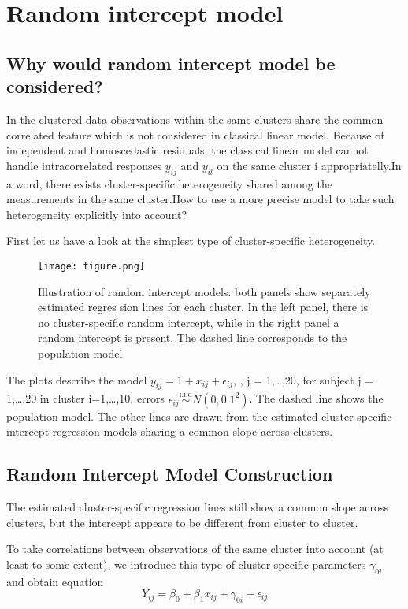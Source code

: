 \documentclass[12pt]{article}
\title{}
\author{Ziwen Tang}
\date{17 February 2019}
\begin{document}
\maketitle
\section{Random intercept model}

\subsection{Why would random intercept model be considered?}
In the clustered data observations within the same clusters share the common correlated feature which is not considered in classical linear model.
Because of independent and homoscedastic residuals, the classical linear model cannot handle intracorrelated responses $y_{ij}$ and $y_{il}$ on the same cluster i appropriatelly.In a word, there exists cluster-specific heterogeneity shared among the measurements in the same cluster.How to use a more precise model to take such heterogeneity explicitly into account? 

First let us have a look at the simplest type of cluster-specific heterogeneity.
\begin{figure}[ht]
\centering
\texttt{[image: figure.png]}
\caption{Illustration of random intercept models: both panels show separately estimated regression lines for each cluster. In the left panel, there is no cluster-specific random intercept, while in
the right panel a random intercept is present. The dashed line corresponds to the population model}
\label{fig:label}
\end{figure}

The plots describe the model $y_{ij} = 1 + x_{ij} +\epsilon_{ij}$, , j = 1,…,20, for subject j = 1,…,20 in cluster i=1,…,10, errors $\epsilon_{ij} \stackrel{\text{i.i.d}}{\sim} N(0,0.1^2)$. The dashed line shows the population model. The other lines are drawn from the estimated cluster-specific intercept regression models sharing a common slope across clusters.

\subsection{Random Intercept Model Construction}
The estimated cluster-specific regression lines still show a common slope across clusters, but the intercept appears to be different from cluster to cluster.

To take correlations between observations of the same cluster 
into account (at least to some extent), we introduce this type of cluster-specific parameters $\gamma_{0i}$ and obtain equation
\begin{equation}\label{4}
Y_{ij} = \beta_0 + \beta_1x_{ij}+\gamma_{0i}+\epsilon_{ij}
\end{equation}
\end{document}
